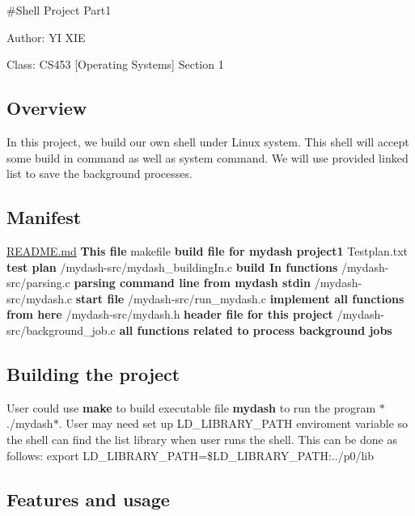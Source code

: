 \#\+Shell Project Part1
\begin{DoxyItemize}
\item Author\+: YI X\+IE
\item Class\+: C\+S453 \mbox{[}Operating Systems\mbox{]} Section 1
\end{DoxyItemize}

\subsection*{Overview}

In this project, we build our own shell under Linux system. This shell will accept some build in command as well as system command. We will use provided linked list to save the background processes.

\subsection*{Manifest}

\hyperlink{README_8md}{R\+E\+A\+D\+M\+E.\+md} {\bfseries This file} makefile {\bfseries build file for mydash project1} Testplan.\+txt {\bfseries test plan} /mydash-\/src/mydash\+\_\+building\+In.c {\bfseries build In functions} /mydash-\/src/parsing.c {\bfseries parsing command line from mydash stdin} /mydash-\/src/mydash.c {\bfseries start file} /mydash-\/src/run\+\_\+mydash.c {\bfseries implement all functions from here} /mydash-\/src/mydash.h {\bfseries header file for this project} /mydash-\/src/background\+\_\+job.c {\bfseries all functions related to process background jobs}

\subsection*{Building the project}

User could use {\bfseries make} to build executable file {\bfseries mydash} to run the program $\ast$./mydash$\ast$. User may need set up L\+D\+\_\+\+L\+I\+B\+R\+A\+R\+Y\+\_\+\+P\+A\+TH enviroment variable so the shell can find the list library when user runs the shell. This can be done as follows\+: \textquotesingle{}export L\+D\+\_\+\+L\+I\+B\+R\+A\+R\+Y\+\_\+\+P\+A\+TH=\$\+L\+D\+\_\+\+L\+I\+B\+R\+A\+R\+Y\+\_\+\+P\+A\+TH\+:../p0/lib\textquotesingle{}

\subsection*{Features and usage}

